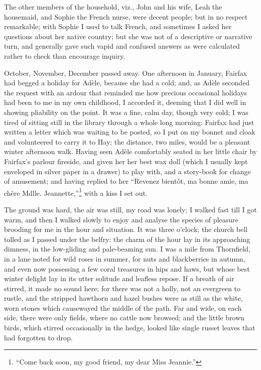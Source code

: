The other members of the household, viz., John and his wife, Leah the
housemaid, and Sophie the French nurse, were decent people; but in no
respect remarkable; with Sophie I used to talk French, and sometimes I
asked her questions about her native country; but she was not of a
descriptive or narrative turn, and generally gave such vapid and
confused answers as were calculated rather to check than encourage
inquiry.

October, November, December passed away. One afternoon in January, \Mrs{}
Fairfax had begged a holiday for Adèle, because she had a cold; and, as
Adèle seconded the request with an ardour that reminded me how precious
occasional holidays had been to me in my own childhood, I accorded it,
deeming that I did well in showing pliability on the point. It was a
fine, calm day, though very cold; I was tired of sitting still in the
library through a whole long morning: \Mrs{} Fairfax had just written a
letter which was waiting to be posted, so I put on my bonnet and cloak
and volunteered to carry it to Hay; the distance, two miles, would be a
pleasant winter afternoon walk. Having seen Adèle comfortably seated in
her little chair by \Mrs{} Fairfax's parlour fireside, and given her her
best wax doll (which I usually kept enveloped in silver paper in a
drawer) to play with, and a story-book for change of amusement; and
having replied to her \foreignquote{french}{Revenez bientôt, ma bonne amie, ma chère
Mdlle. Jeannette,}\footnote{\enquote{Come back soon, my good friend, my dear Miss Jeannie.}} with a kiss I set out.

The ground was hard, the air was still, my road was lonely; I walked
fast till I got warm, and then I walked slowly to enjoy and analyse the
species of pleasure brooding for me in the hour and situation. It was
three o'clock; the church bell tolled as I passed under the belfry: the
charm of the hour lay in its approaching dimness, in the low-gliding and
pale-beaming sun. I was a mile from Thornfield, in a lane noted for
wild roses in summer, for nuts and blackberries in autumn, and even now
possessing a few coral treasures in hips and haws, but whose best winter
delight lay in its utter solitude and leafless repose. If a breath of
air stirred, it made no sound here; for there was not a holly, not an
evergreen to rustle, and the stripped hawthorn and hazel bushes were as
still as the white, worn stones which causewayed the middle of the
path. Far and wide, on each side, there were only fields, where no
cattle now browsed; and the little brown birds, which stirred
occasionally in the hedge, looked like single russet leaves that had
forgotten to drop.

